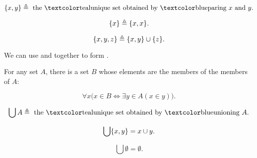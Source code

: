 \begin{frame}{}
  \begin{definition}[``$\set{x, y}$'']
    \[
      \set{x, y} \triangleq \text{ the \teal{unique} set obtained by \blue{paring} } x \text{ and } y.
    \]
  \end{definition}

  \begin{definition}[$\set{x}$]
    \[
      \{x\} \triangleq \{x, x\}.
    \]
  \end{definition}

  \pause
  \begin{definition}[$\set{x, y, z}$]
    \[
      \{x, y, z\} \triangleq \{x, y\} \cup \{z\}.
    \]
  \end{definition}

  \pause
  \begin{center}
    We can use  and  together to form .
  \end{center}
\end{frame}

\begin{frame}{}
  \begin{axiom}
    For any set $A$, there is a set $B$ whose elements are 
    the members of the members of $A$:

    \[
      \forall x \big( x \in B \iff \exists y \in A (x \in y) \big).
    \]
  \end{axiom}

  \pause
  \begin{definition}[$\bigcup A$]
    \[
      \bigcup A \triangleq \text{ the \teal{unique} set obtained by \blue{unioning} } A.
    \]
  \end{definition}

  \pause
  \begin{theorem}
    \[
      \bigcup \{x, y\} = x \cup y.
    \]
  \end{theorem}

  \pause
  \begin{theorem}
    \[
      \bigcup \emptyset = \emptyset.
    \]
  \end{theorem}
\end{frame}

